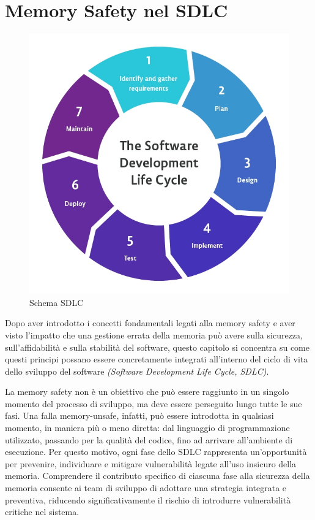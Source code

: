 \chapter{Memory Safety nel SDLC}
\label{cha:sdlc}

\begin{figure}
	\centering
	\includegraphics[width=\linewidth]{images/sdlc.png}
	\caption[Schema SDLC]{Schema SDLC\protect\footnotemark}
	\label{fig:sdlc_img}
\end{figure}

Dopo aver introdotto i concetti fondamentali legati alla memory safety e aver visto
l'impatto che una gestione errata della memoria può avere sulla sicurezza, sull'affidabilità
e sulla stabilità del software, questo capitolo si concentra su come questi principi
possano essere concretamente integrati all'interno del ciclo di vita dello sviluppo
del software \textit{(Software Development Life Cycle, SDLC)}.

La memory safety non è un obiettivo che può essere raggiunto in un singolo
momento del processo di sviluppo, ma deve essere perseguito lungo tutte le sue fasi.
Una falla memory-unsafe, infatti, può essere introdotta in qualsiasi momento, in
maniera più o meno diretta: dal linguaggio di programmazione utilizzato, passando
per la qualità del codice, fino ad arrivare all'ambiente di esecuzione. Per questo
motivo, ogni fase dello SDLC rappresenta un'opportunità per prevenire, individuare
e mitigare vulnerabilità legate all'uso insicuro della memoria. Comprendere il
contributo specifico di ciascuna fase alla sicurezza della memoria consente ai
team di sviluppo di adottare una strategia integrata e preventiva, riducendo significativamente
il rischio di introdurre vulnerabilità critiche nel sistema.

